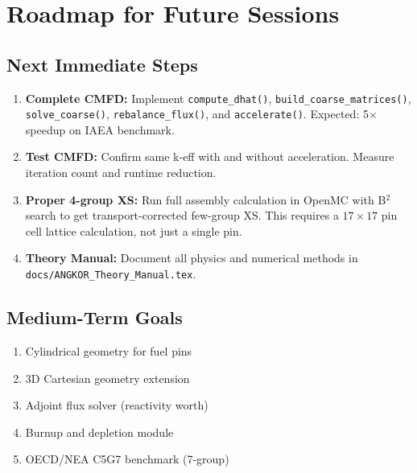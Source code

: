 \documentclass[12pt,a4paper]{article}
\begin{document}
\section{Roadmap for Future Sessions}

\subsection{Next Immediate Steps}

\begin{enumerate}
  \item \textbf{Complete CMFD:} Implement \texttt{compute\_dhat()},
        \texttt{build\_coarse\_matrices()}, \texttt{solve\_coarse()},
        \texttt{rebalance\_flux()}, and \texttt{accelerate()}.
        Expected: 5$\times$ speedup on IAEA benchmark.

  \item \textbf{Test CMFD:} Confirm same k-eff with and without acceleration.
        Measure iteration count and runtime reduction.

  \item \textbf{Proper 4-group XS:} Run full assembly calculation in OpenMC
        with B$^2$ search to get transport-corrected few-group XS.
        This requires a $17\times17$ pin cell lattice calculation, not just
        a single pin.

  \item \textbf{Theory Manual:} Document all physics and numerical methods
        in \texttt{docs/ANGKOR\_Theory\_Manual.tex}.
\end{enumerate}

\subsection{Medium-Term Goals}

\begin{enumerate}
  \item Cylindrical geometry for fuel pins
  \item 3D Cartesian geometry extension
  \item Adjoint flux solver (reactivity worth)
  \item Burnup and depletion module
  \item OECD/NEA C5G7 benchmark (7-group)
\end{enumerate}
\end{document}
